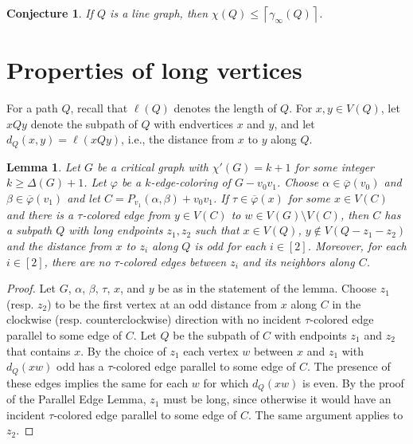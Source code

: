 \documentclass[12pt]{amsart}
\theoremstyle{plain}
\newtheorem{lem}[thm]{Lemma}
\newtheorem{conj}[thm]{Conjecture}
\theoremstyle{definition}
\theoremstyle{remark}
\newcommand{\ceil}[1]{\left\lceil#1\right\rceil}
\newcommand{\irange}[1]{\left[#1\right]}
\newcommand{\vph}{\varphi}
\newcommand{\vphn}{\overline{\varphi}}
\begin{document}
\begin{conj}\label{SuperDuperDuperLocalReed}
If $Q$ is a line graph, then $\chi(Q) \le \ceil{\gamma_\infty(Q)}$.
\end{conj}

\section{Properties of long vertices}
For a path $Q$, recall that $\ell(Q)$ denotes the length of $Q$.
For $x,y \in V(Q)$, let $xQy$ denote the subpath of $Q$ with
endvertices $x$ and $y$, and let $d_Q(x,y) = \ell(xQy)$, i.e., the distance
from $x$ to $y$ along $Q$.

\begin{lem}\label{TauEscape}
Let $G$ be a critical graph with $\chi'(G) = k+1$ for some integer $k \ge \Delta(G) + 1$.
Let $\vph$ be a $k$-edge-coloring of $G-v_0v_1$. Choose $\alpha \in \vphn(v_0)$
and $\beta \in \vphn(v_1)$ and let $C = P_{v_1}(\alpha, \beta) + v_0v_1$.  If
$\tau \in \vphn(x)$ for some $x \in V(C)$ and there is a $\tau$-colored edge
from $y \in V(C)$ to $w \in V(G) \setminus V(C)$, then $C$ has a subpath $Q$
with long endpoints $z_1,z_2$ such that $x \in V(Q)$, $y \not \in V(Q-z_1-z_2)$
and the distance from $x$ to $z_i$ along $Q$ is odd for each $i \in \irange{2}$. 
Moreover, for each $i \in \irange{2}$, there are no $\tau$-colored edges
between $z_i$ and its neighbors along $C$.
\end{lem}
\begin{proof}
Let $G$, $\alpha$, $\beta$, $\tau$, $x$, and $y$ be as in the statement of the
lemma.  Choose $z_1$ (resp. $z_2$) to be the first vertex at an odd distance
from $x$ along $C$ in the clockwise (resp. counterclockwise) direction with no
incident $\tau$-colored edge parallel to some edge of $C$.  
Let $Q$ be the subpath of $C$ with endpoints $z_1$ and $z_2$ that contains $x$.
By the choice of $z_1$ each vertex $w$ between $x$ and $z_1$ with $d_Q(xw)$ odd
has a $\tau$-colored edge parallel to some edge of $C$.  The presence of these
edges implies the same for each $w$ for which $d_Q(xw)$ is even.  By the proof
of the Parallel Edge Lemma, $z_1$ must be long, since otherwise it would have an
incident $\tau$-colored edge parallel to some edge of $C$.  The same argument
applies to $z_2$.
%
\end{proof}
\end{document}

